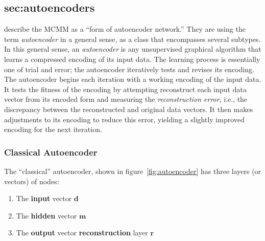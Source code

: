 \subsection{sec:autoencoders}
\label{sec:autoencoders}
\citet[][p. 2]{dayan-and-zemel:95} describe the MCMM as a ``form of autoencoder network.'' 
They are using the term \emph{autoencoder} in a general sense, as a class that encompasses several subtypes.  
In this general sense, an \emph{autoencoder} is any unsupervised graphical algorithm that
 learns a compressed encoding of its input data. 
The learning process is essentially one of trial and error; the autoencoder iteratively tests and revises its encoding.  
The autoencoder begins each iteration with a working encoding of the input data. It tests the fitness of the encoding by attempting reconstruct each input data vector from its encoded form and measuring the \emph{reconstruction error}, i.e., the discrepancy between the reconstructed and original data vectors.  It then makes adjustments to its encoding to reduce this error, yielding a slightly improved encoding for the next iteration. 

\subsubsection{Classical Autoencoder}
\label{sec:classical-auto}
 The ``classical'' autoencoder,
shown in figure~\ref{fig:autoencoder} has three layers (or vectors) of nodes:
\begin{enumerate}
\item The \textbf{input} vector $\textbf{d}$
\item The \textbf{hidden} vector $\textbf{m}$
\item The \textbf{output} vector \textbf{reconstruction} layer $\textbf{r}$ 
\end{enumerate}

